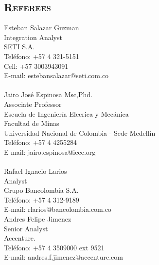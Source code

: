 \begin{resume}
\section{\textsc{Referees}}


 Esteban Salazar Guzman\\
 Integration Analyst \\
 SETI S.A. \\
 Tel\'{e}fono: +57 4 321-5151 \\
 Cell: +57 3003943091 \\ 
 E-mail: estebansalazar@seti.com.co\\
 \\  
 Jairo Jos\'{e} Espinosa Msc,Phd.\\
 Associate Professor \\
 Escuela de Ingenier\'{i}a Elecrica y Mec\'{a}nica \\
 Facultad de Minas \\
 Universidad Nacional de Colombia - Sede  Medell\'{i}n\\
 Tel\'{e}fono: +57 4 4255284 \\
 E-mail: jairo.espinosa@ieee.org\\
 \\  
  Rafael Ignacio Larios\\
 Analyst  \\
 Grupo Bancolombia S.A. \\
 Tel\'{e}fono: +57 4 312-9189  \\
 E-mail: rlarios@bancolombia.com.co \\

 Andres Felipe Jimenez\\
 Senior Analyst  \\
 Accenture. \\
 Tel\'{e}fono: +57 4 3509000 ext 9521  \\
 E-mail: andres.f.jimenez@accenture.com \\


\end{resume}
